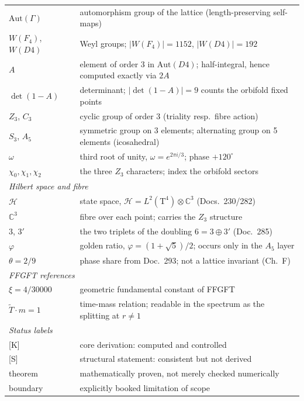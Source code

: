 \documentclass[11pt]{report}
\begin{document}
\begin{center}
{\begin{longtable}{lp{9.6cm}}
$\text{Aut}(\Gamma)$ & automorphism group of the lattice
  (length-preserving self-maps) \\
$W(F_4)$, $W(D4)$ & Weyl groups; $|W(F_4)| = 1152$,
  $|W(D4)| = 192$ \\
$A$ & element of order 3 in $\text{Aut}(D4)$; half-integral, hence
  computed exactly via $2A$ \\
$\det(1-A)$ & determinant; $|\det(1-A)| = 9$ counts the orbifold
  fixed points \\
$Z_3$, $C_3$ & cyclic group of order 3 (triality resp.\ fibre
  action) \\
$S_3$, $A_5$ & symmetric group on 3 elements; alternating group on
  5 elements (icosahedral) \\
$\omega$ & third root of unity, $\omega = e^{2\pi i/3}$;
  phase $+120^\circ$ \\
$\chi_0,\chi_1,\chi_2$ & the three $Z_3$ characters; index the
  orbifold sectors \\
\midrule
\multicolumn{2}{l}{\textit{Hilbert space and fibre}} \\
$\mathcal{H}$ & state space,
  $\mathcal{H} = L^2(\text{T}^4)\otimes\mathbb{C}^3$
  (Docs.~230/282) \\
$\mathbb{C}^3$ & fibre over each point; carries the $Z_3$
  structure \\
$3$, $3'$ & the two triplets of the doubling $6 = 3\oplus3'$
  (Doc.~285) \\
$\varphi$ & golden ratio, $\varphi = (1+\sqrt5)/2$; occurs only in
  the $A_5$ layer \\
$\theta = 2/9$ & phase share from Doc.~293; not a lattice invariant
  (Ch.~F) \\
\midrule
\multicolumn{2}{l}{\textit{FFGFT references}} \\
$\xi = 4/30000$ & geometric fundamental constant of FFGFT \\
$\tilde T\cdot m = 1$ & time-mass relation; readable in the
  spectrum as the splitting at $r \ne 1$ \\
\midrule
\multicolumn{2}{l}{\textit{Status labels}} \\
{}[K] & core derivation: computed and controlled \\
{}[S] & structural statement: consistent but not derived \\
theorem & mathematically proven, not merely checked numerically \\
boundary & explicitly booked limitation of scope \\
\end{longtable}
}
\end{center}
\end{document}
